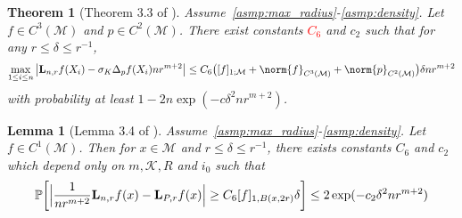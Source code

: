 \documentclass{article}
\newcommand{\abs}[1]{\left \lvert #1 \right \rvert}
\newcommand{\1}{\mathbf{1}}
\newcommand{\Lap}{{\bf L}}
\newcommand{\Pbb}{\mathbb{P}}
\newcommand{\mc}[1]{\mathcal{#1}}
\theoremstyle{alden}
\theoremstyle{aldenthm}
\newtheorem{theorem}{Theorem}
\newtheorem{lemma}{Lemma}
\theoremstyle{definition}
\theoremstyle{remark}
\begin{document}
\begin{theorem}[Theorem 3.3 of \citep{calder2019}]
	\label{thm:calder19_1}
	Assume~\ref{asmp:max_radius}-\ref{asmp:density}. Let $f \in C^3(\mc{M})$ and $p \in C^2(\mc{M})$. There exist constants \textcolor{red}{$C_6$} and $c_2$ such that for any $r \leq \delta \leq r^{-1}$, 
	\begin{equation*}
	\max_{1 \leq i \leq n} \abs{\Lap_{n,r}f(X_i) - \sigma_{K} \Delta_{p} f(X_i) nr^{m + 2}} \leq C_6 \bigl([f]_{1;\mc{M}} + \norm{f}_{C^3(\mc{M})} + \norm{p}_{C^2(\mc{M})}\bigr) \delta  nr^{m + 2} 
	\end{equation*}
	with probability at least $1 - 2n\exp(-c\delta^2 nr^{m+2})$.
\end{theorem}



\begin{lemma}[Lemma 3.4 of \citep{calder2019}]
	\label{lem:calder19}
	Assume~\ref{asmp:max_radius}-\ref{asmp:density}. Let $f \in C^1(\mc{M})$. Then for $x \in \mc{M}$ and $r \leq \delta \leq r^{-1}$,
	there exists constants $C_6$ and $c_2$ which depend only on $m,\mc{K},R$ and $i_0$ such that
	\begin{equation*}
	\Pbb\biggl[\Bigl|\frac{1}{nr^{m + 2}} \Lap_{n,r}f(x) - \Lap_{P,r}f(x)\Bigr| \geq C_6 [f]_{1,B(x,2r)} \delta \biggr] \leq 2\exp(-c_2\delta^2 n r^{m + 2})
	\end{equation*}
\end{lemma}
\end{document}
